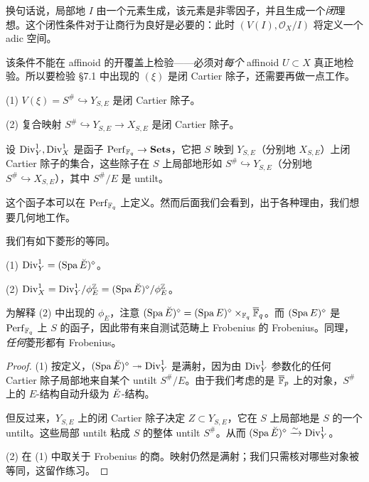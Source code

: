 换句话说，局部地 $I$ 由一个元素生成，该元素是非零因子，并且生成一个\emph{闭}理想。这个闭性条件对于让商行为良好是必要的：此时 $(V(I),\mathcal O_X/I)$ 将定义一个 adic 空间。

\begin{warning}
该条件不能在 affinoid 的开覆盖上检验——必须对\emph{每个} affinoid $U \subset X$ 真正地检验。所以要检验 §7.1 中出现的 $(\xi)$ 是闭 Cartier 除子，还需要再做一点工作。
\end{warning}

\begin{proposition}
(1) $V(\xi) = S^{\#} \hookrightarrow Y_{S,E}$ 是闭 Cartier 除子。

(2) 复合映射 $S^{\#} \hookrightarrow Y_{S,E} \to X_{S,E}$ 是闭 Cartier 除子。
\end{proposition}

\begin{definition}
设 $\mathrm{Div}^1_Y, \mathrm{Div}^1_X$ 是函子 $\mathrm{Perf}_{\mathbb{F}_q} \to \mathbf{Sets}$，它把 $S$ 映到 $Y_{S,E}$（分别地 $X_{S,E}$）上闭 Cartier 除子的集合，这些除子在 $S$ 上局部地形如 $S^{\#} \hookrightarrow Y_{S,E}$（分别地 $S^{\#} \hookrightarrow X_{S,E}$），其中 $S^{\#}/E$ 是 untilt。
\end{definition}

\begin{remark}
这个函子本可以在 $\mathrm{Perf}_{\mathbb{F}_q}$ 上定义。然而后面我们会看到，出于各种理由，我们想要几何地工作。
\end{remark}

\begin{proposition}
我们有如下菱形的等同。

(1) $\mathrm{Div}^1_Y = (\operatorname{Spa} \breve{E})^{\diamond}$。

(2) $\mathrm{Div}^1_X = \mathrm{Div}^1_Y/\phi_E^{\mathbb Z} = (\operatorname{Spa} \breve{E})^{\diamond}/\phi_E^{\mathbb Z}$。
\end{proposition}

为解释 (2) 中出现的 $\phi_E$，注意 $(\operatorname{Spa} \breve{E})^{\diamond} = (\operatorname{Spa} E)^{\diamond} \times_{\mathbb{F}_q} \overline{\mathbb{F}}_q$。而 $(\operatorname{Spa} E)^{\diamond}$ 是 $\mathrm{Perf}_{\mathbb{F}_q}$ 上 $S$ 的函子，因此带有来自测试范畴上 Frobenius 的 Frobenius。同理，\emph{任何}菱形都有 Frobenius。


\begin{proof}
(1) 按定义，$(\operatorname{Spa} \breve{E})^{\diamond} \twoheadrightarrow \mathrm{Div}^1_Y$ 是满射，因为由 $\mathrm{Div}^1_Y$ 参数化的任何 Cartier 除子局部地来自某个 untilt $S^{\#}/E$。由于我们考虑的是 $\overline{\mathbb{F}}_p$ 上的对象，$S^{\#}$ 上的 $E$-结构自动升级为 $\breve{E}$-结构。

但反过来，$Y_{S,E}$ 上的闭 Cartier 除子决定 $Z \subset Y_{S,E}$，它在 $S$ 上局部地是 $S$ 的一个 untilt。这些局部 untilt 粘成 $S$ 的整体 untilt $S^{\#}$。从而 $(\operatorname{Spa} \breve{E})^{\diamond} \xrightarrow{\sim} \mathrm{Div}^1_Y$。

(2) 在 (1) 中取关于 Frobenius 的商。映射仍然是满射；我们只需核对哪些对象被等同，这留作练习。
\end{proof}

